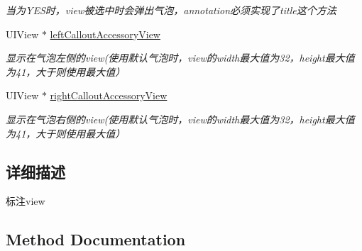 \begin{DoxyCompactItemize}
\begin{DoxyCompactList}\small\item\em 当为\+Y\+E\+S时，view被选中时会弹出气泡，annotation必须实现了title这个方法 \end{DoxyCompactList}\item 
\hypertarget{interface_b_m_k_annotation_view_ae182c0fb7dc1898c4941a123def7f926}{}U\+I\+View $\ast$ \hyperlink{interface_b_m_k_annotation_view_ae182c0fb7dc1898c4941a123def7f926}{left\+Callout\+Accessory\+View}\label{interface_b_m_k_annotation_view_ae182c0fb7dc1898c4941a123def7f926}

\begin{DoxyCompactList}\small\item\em 显示在气泡左侧的view(使用默认气泡时，view的width最大值为32，height最大值为41，大于则使用最大值） \end{DoxyCompactList}\item 
\hypertarget{interface_b_m_k_annotation_view_a65793288845c27e23233373b3e6b6216}{}U\+I\+View $\ast$ \hyperlink{interface_b_m_k_annotation_view_a65793288845c27e23233373b3e6b6216}{right\+Callout\+Accessory\+View}\label{interface_b_m_k_annotation_view_a65793288845c27e23233373b3e6b6216}

\begin{DoxyCompactList}\small\item\em 显示在气泡右侧的view(使用默认气泡时，view的width最大值为32，height最大值为41，大于则使用最大值） \end{DoxyCompactList}\end{DoxyCompactItemize}


\subsection{详细描述}
标注view 

\subsection{Method Documentation}
\hypertarget{interface_b_m_k_annotation_view_ae2b46541ec52b7d8ee0857a9ec369f5f}{}
